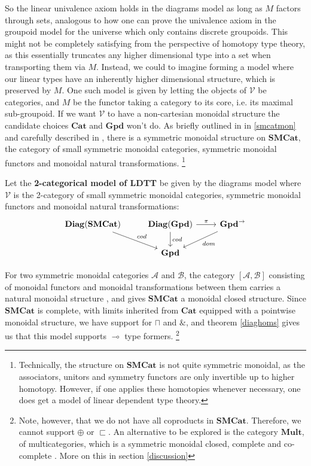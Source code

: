 \documentclass[a4paper,english]{lipics-v2018}
\DeclareMathOperator{\diag}{\mathbf{Diag}}
\begin{document}
So the linear univalence axiom holds in the diagrams model as long as $M$ factors through sets, analogous to how one can prove the univalence axiom in the groupoid model for the universe which only contains discrete groupoids. This might not be completely satisfying from the perspective of homotopy type theory, as this essentially truncates any higher dimensional type into a set when transporting them via $M$. Instead, we could to imagine forming a model where our linear types have an inherently higher dimensional structure, which is preserved by $M$. One such model is given by letting the objects of $\mathcal{V}$ be categories, and $M$ be the functor taking a category to its core, i.e. its maximal sub-groupoid. If we want $\mathcal{V}$ to have a non-cartesian monoidal structure the candidate choices $\mathbf{Cat}$ and $\mathbf{Gpd}$ won't do. As briefly outlined in in \ref{smcatmon} and carefully described in \cite{smcat}, there is a symmetric monoidal structure on $\mathbf{SMCat}$, the category of small symmetric monoidal categories, symmetric monoidal functors and monoidal natural transformations. \footnote{Technically, the structure on $\mathbf{SMCat}$ is not quite symmetric monoidal, as the associators, unitors and symmetry functors are only invertible up to higher homotopy. However, if one applies these homotopies whenever necessary, one does get a model of linear dependent type theory.}
\begin{definition}
 Let the \textbf{2-categorical model of LDTT} be given by the diagrams model where $\mathcal{V}$ is the 2-category of small symmetric monoidal categories, symmetric monoidal functors and monoidal natural transformations:
  \[
    \begin{tikzcd}
    \diag(\mathbf{SMCat}) \ar[rd, "cod"] & \diag(\mathbf{Gpd}) \ar[r, "\pi"] \ar[d, "cod"] & \mathbf{Gpd}^\to \ar[ld, "dom"]\\
    & \mathbf{Gpd}
    \end{tikzcd}
  \]
\end{definition}
For two symmetric monoidal categories $\mathcal{A}$ and $\mathcal{B}$, the category $[\mathcal{A}, \mathcal{B}]$ consisting of monoidal functors and monoidal transformations between them carries a natural monoidal structure \cite{smcat}, and gives $\mathbf{SMCat}$ a monoidal closed structure. Since $\mathbf{SMCat}$ is complete, with limits inherited from $\mathbf{Cat}$ equipped with a pointwise monoidal structure, we have support for $\sqcap$ and $\&$, and theorem \ref{diaghoms} gives us that this model supports $\multimap$ type formers. \footnote{Note, however, that we do not have all coproducts in $\mathbf{SMCat}$. Therefore, we cannot support $\oplus$ or $\sqsubset$. An alternative to be explored is the category $\mathbf{Mult}$, of multicategories, which is a symmetric monoidal closed, complete and co-complete \cite{elmendorf2009permutative}. More on this in section \ref{discussion}}
\end{document}
